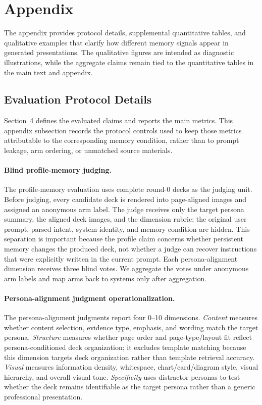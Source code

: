 \section{Appendix}

The appendix provides protocol details, supplemental quantitative tables, and
qualitative examples that clarify how different memory signals appear in
generated presentations. The qualitative figures are intended as diagnostic
illustrations, while the aggregate claims remain tied to the quantitative
tables in the main text and appendix.

\subsection{Evaluation Protocol Details}
\label{app:evaluation_protocol_details}

Section~4 defines the evaluated claims and reports the main metrics. This
appendix subsection records the protocol controls used to keep those metrics
attributable to the corresponding memory condition, rather than to prompt
leakage, arm ordering, or unmatched source materials.

\paragraph{Blind profile-memory judging.}
The profile-memory evaluation uses complete round-0 decks as the judging unit.
Before judging, every candidate deck is rendered into page-aligned images and
assigned an anonymous arm label. The judge receives only the target persona
summary, the aligned deck images, and the dimension rubric; the original user
prompt, parsed intent, system identity, and memory condition are hidden. This
separation is important because the profile claim concerns whether persistent
memory changes the produced deck, not whether a judge can recover instructions
that were explicitly written in the current prompt. Each persona-alignment
dimension receives three blind votes. We aggregate the votes under anonymous
arm labels and map arms back to systems only after aggregation.

\paragraph{Persona-alignment judgment operationalization.}
The persona-alignment judgments report four 0--10 dimensions. \textit{Content}
measures whether content selection, evidence type, emphasis, and wording match
the target persona. \textit{Structure} measures whether page order and
page-type/layout fit reflect persona-conditioned deck organization; it excludes
template matching because this dimension targets deck organization rather than
template retrieval accuracy. \textit{Visual} measures information density,
whitespace, chart/card/diagram style, visual hierarchy, and overall visual tone.
\textit{Specificity} uses distractor personas to test whether the deck remains
identifiable as the target persona rather than a generic professional
presentation.

